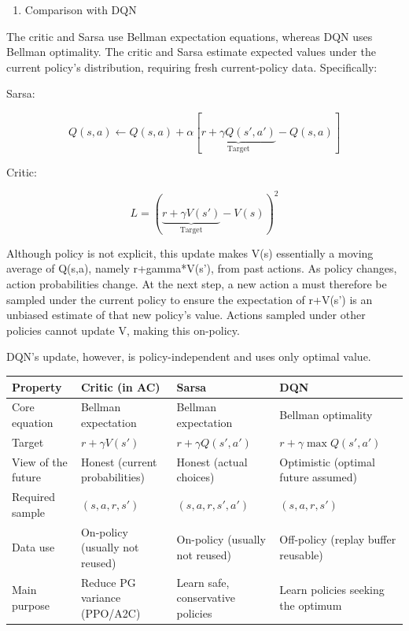 \begin{enumerate}
\def\labelenumi{(\arabic{enumi})}
\setcounter{enumi}{1}
\tightlist
\item
  Comparison with DQN
\end{enumerate}

The critic and Sarsa use Bellman expectation equations, whereas DQN uses Bellman optimality. The critic and Sarsa estimate expected values under the current policy's distribution, requiring fresh current-policy data. Specifically:

Sarsa:

\[
Q(s,a)\leftarrow Q(s,a)+\alpha\left[\underbrace{r+\gamma Q(s',a')}_{\text{Target}}-Q(s,a)\right]
\]

Critic:

\[
L=\left(\underbrace{r+\gamma V(s')}_{\text{Target}}-V(s)\right)^2
\]

Although policy is not explicit, this update makes V(s) essentially a moving average of Q(s,a), namely r+gamma*V(s'), from past actions. As policy changes, action probabilities change. At the next step, a new action a must therefore be sampled under the current policy to ensure the expectation of r+V(s') is an unbiased estimate of that new policy's value. Actions sampled under other policies cannot update V, making this on-policy.

DQN's update, however, is policy-independent and uses only optimal value.

\begin{longtable}[]{@{}
  >{\raggedright\arraybackslash}p{}
  >{\raggedright\arraybackslash}p{}
  >{\raggedright\arraybackslash}p{}
  >{\raggedright\arraybackslash}p{}@{}}
\toprule
Property & Critic (in AC) & Sarsa & DQN \\
\midrule
\endhead
Core equation & Bellman expectation & Bellman expectation & Bellman optimality \\
Target & \(r+\gamma V(s')\) & \(r+\gamma Q(s',a')\) & \(r+\gamma\max Q(s',a')\) \\
View of the future & Honest (current probabilities) & Honest (actual choices) & Optimistic (optimal future assumed) \\
Required sample & \((s,a,r,s')\) & \((s,a,r,s',a')\) & \((s,a,r,s')\) \\
Data use & On-policy (usually not reused) & On-policy (usually not reused) & Off-policy (replay buffer reusable) \\
Main purpose & Reduce PG variance (PPO/A2C) & Learn safe, conservative policies & Learn policies seeking the optimum \\
\bottomrule
\end{longtable}

